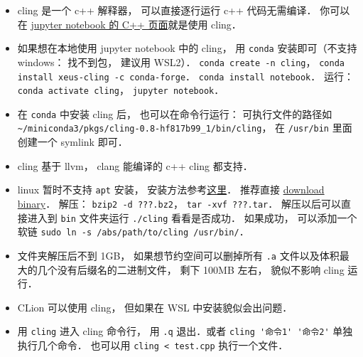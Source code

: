 
\begin{issues}
\issueDraft
\end{issues}

\begin{itemize}
\item cling 是一个 c++ 解释器， 可以直接逐行运行 c++ 代码无需编译． 你可以在 \href{https://jupyter.org/try}{jupyter notebook 的 C++ 页面}就是使用 cling．
\item 如果想在本地使用 jupyter notebook 中的 cling， 用 \verb|conda| 安装即可（不支持 windows： 找不到包， 建议用 WSL2）． \verb|conda create -n cling|， \verb|conda install xeus-cling -c conda-forge|． \verb|conda install notebook|． 运行： \verb|conda activate cling|， \verb|jupyter notebook|．
\item 在 \verb|conda| 中安装 cling 后， 也可以在命令行运行： 可执行文件的路径如 \verb|~/miniconda3/pkgs/cling-0.8-hf817b99_1/bin/cling|， 在 \verb|/usr/bin| 里面创建一个 symlink 即可．
\item cling 基于 llvm， clang 能编译的 c++ cling 都支持．
\item linux 暂时不支持 \verb|apt| 安装， 安装方法参考\href{https://kaustubh13.medium.com/how-to-install-cling-on-linux-or-wsl-8125798ed9b9}{这里}． 推荐直接 \href{https://root.cern/download/cling/}{download binary}． 解压： \verb|bzip2 -d ???.bz2|， \verb|tar -xvf ???.tar|． 解压以后可以直接进入到 \verb|bin| 文件夹运行 \verb|./cling| 看看是否成功． 如果成功， 可以添加一个软链 \verb|sudo ln -s /abs/path/to/cling /usr/bin/|．
\item 文件夹解压后不到 1GB， 如果想节约空间可以删掉所有 \verb|.a| 文件以及体积最大的几个没有后缀名的二进制文件， 剩下 100MB 左右， 貌似不影响 cling 运行．
\item CLion 可以使用 cling， 但如果在 WSL 中安装貌似会出问题．
\item 用 \verb|cling| 进入 cling 命令行， 用 \verb|.q| 退出．或者 \verb|cling '命令1' '命令2'| 单独执行几个命令． 也可以用 \verb|cling < test.cpp| 执行一个文件．
\end{itemize}

